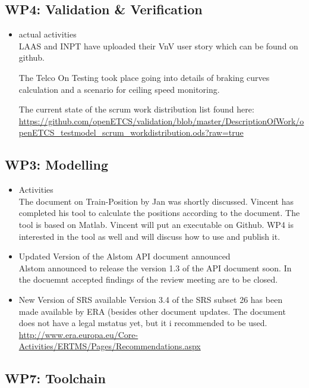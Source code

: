 \documentclass[a4paper, 11pt]{article}
\begin{document}
\subsection{WP4: Validation \& Verification}
\begin{itemize}
\item actual activities\\
LAAS and INPT have uploaded their VnV user story which can be found on github.

The  Telco On Testing took place going into details of braking curves calculation and a scenario for ceiling speed monitoring.

The current state of the scrum work distribution list found here: \url{https://github.com/openETCS/validation/blob/master/DescriptionOfWork/openETCS_testmodel_scrum_workdistribution.ods?raw=true}

\end{itemize}

\subsection{WP3: Modelling}

\begin{itemize}
\item Activities\\
The document on Train-Position by Jan was shortly discussed. Vincent has completed his tool to calculate the positions according to the document. The tool is based on Matlab. Vincent will put an executable on Github. WP4 is interested in the tool as well and will discuss how to use and publish it.

\item Updated Version of the Alstom API document announced\\
Alstom announced  to release the version 1.3 of the API document soon. In the docuemnt accepted findings of the review meeting are to be closed.

\item New Version of SRS available
Version 3.4 of the SRS subset 26 has been made available by ERA (besides other document updates. The document does not have a legal mstatus yet, but it i recommended to be used.
\url{http://www.era.europa.eu/Core-Activities/ERTMS/Pages/Recommendations.aspx}

\end{itemize}

\subsection{WP7: Toolchain}
\end{document}
